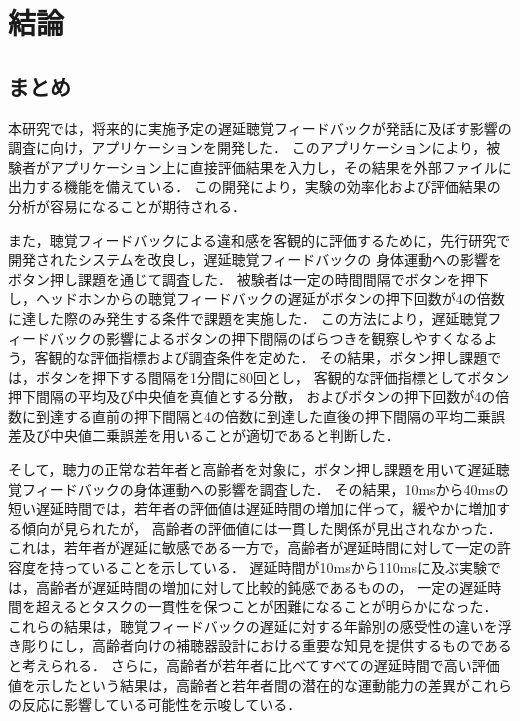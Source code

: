 \chapter{結論}
\section{まとめ}
本研究では，将来的に実施予定の遅延聴覚フィードバックが発話に及ぼす影響の調査に向け，アプリケーションを開発した．
このアプリケーションにより，被験者がアプリケーション上に直接評価結果を入力し，その結果を外部ファイルに出力する機能を備えている．
この開発により，実験の効率化および評価結果の分析が容易になることが期待される．

また，聴覚フィードバックによる違和感を客観的に評価するために，先行研究\cite{shigematu}で開発されたシステムを改良し，遅延聴覚フィードバックの
身体運動への影響をボタン押し課題を通じて調査した．
被験者は一定の時間間隔でボタンを押下し，ヘッドホンからの聴覚フィードバックの遅延がボタンの押下回数が4の倍数に達した際のみ発生する条件で課題を実施した．
この方法により，遅延聴覚フィードバックの影響によるボタンの押下間隔のばらつきを観察しやすくなるよう，客観的な評価指標および調査条件を定めた．
その結果，ボタン押し課題では，ボタンを押下する間隔を1分間に80回とし，
客観的な評価指標としてボタン押下間隔の平均及び中央値を真値とする分散，
およびボタンの押下回数が4の倍数に到達する直前の押下間隔と4の倍数に到達した直後の押下間隔の平均二乗誤差及び中央値二乗誤差を用いることが適切であると判断した．

そして，聴力の正常な若年者と高齢者を対象に，ボタン押し課題を用いて遅延聴覚フィードバックの身体運動への影響を調査した．
その結果，10msから40msの短い遅延時間では，若年者の評価値は遅延時間の増加に伴って，緩やかに増加する傾向が見られたが，
高齢者の評価値には一貫した関係が見出されなかった．
これは，若年者が遅延に敏感である一方で，高齢者が遅延時間に対して一定の許容度を持っていることを示している．
遅延時間が10msから110msに及ぶ実験では，高齢者が遅延時間の増加に対して比較的鈍感であるものの，
一定の遅延時間を超えるとタスクの一貫性を保つことが困難になることが明らかになった．
これらの結果は，聴覚フィードバックの遅延に対する年齢別の感受性の違いを浮き彫りにし，高齢者向けの補聴器設計における重要な知見を提供するものであると考えられる．
さらに，高齢者が若年者に比べてすべての遅延時間で高い評価値を示したという結果は，高齢者と若年者間の潜在的な運動能力の差異がこれらの反応に影響している可能性を示唆している．
